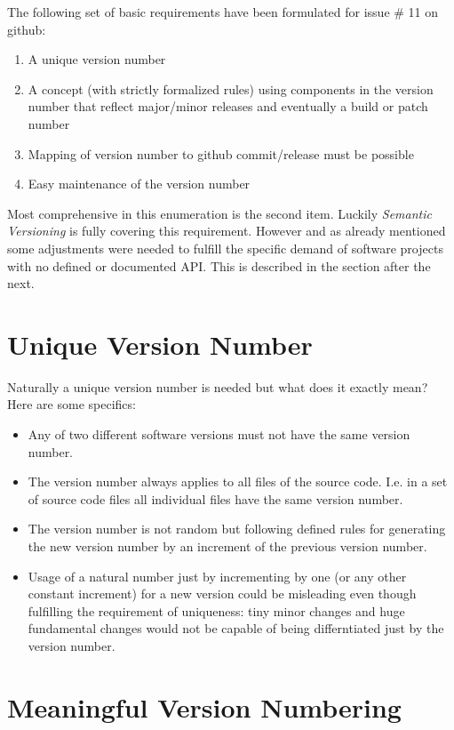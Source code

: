 \documentclass[10pt,a4paper]{article}
\begin{document}
The following set of basic requirements have been formulated for issue \# 11 on github:

\begin{enumerate}
\item A unique version number
\item A concept (with strictly formalized rules) using components in the version number that reflect major/minor releases and eventually a build or patch number
\item Mapping of version number to github commit/release must be possible
\item Easy maintenance of the version number
\end{enumerate}

Most comprehensive in this enumeration is the second item. Luckily \textit{Semantic Versioning} is fully covering this requirement. However and as already mentioned some adjustments were needed to fulfill the specific demand of software projects with no defined or documented API. This is described in the section after the next.

\section*{Unique Version Number}

Naturally a unique version number is needed but what does it exactly mean? Here are some specifics:

\begin{itemize}
\item Any of two different software versions must not have the same version number.
\item The version number always applies to all files of the source code. I.e. in a set of source code files all individual files have the same version number.
\item The version number is not random but following defined rules for generating the new version number by an increment of the previous version number.
\item Usage of a natural number just by incrementing by one (or any other constant increment) for a new version could be misleading even though fulfilling the requirement of uniqueness: tiny minor changes and huge fundamental changes would not be capable of being differntiated just by the version number.
\end{itemize}

\section*{Meaningful Version Numbering}
\end{document}
